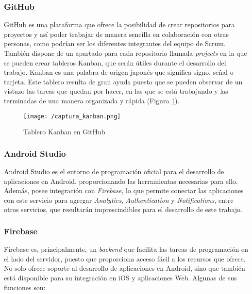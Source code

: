 \subsubsection*{GitHub}
GitHub es una plataforma que ofrece la posibilidad de crear repositorios para proyectos y así poder trabajar de manera sencilla en colaboración con otras personas, como podrían ser los diferentes integrantes del equipo de Scrum. También dispone de un apartado para cada repositorio llamada \textit{projects} en la que se pueden crear tableros Kanban, que serán útiles durante el desarrollo del trabajo. Kanban \cite{Gomez2017} es una palabra de origen japonés que significa signo, señal o tarjeta. Este tablero resulta de gran ayuda puesto que se pueden observar de un vistazo las tareas que quedan por hacer, en las que se está trabajando y las terminadas de una manera organizada y rápida (Figura \ref{fig:kanban}).

\begin{figure}[!h]
	\begin{center}
		\texttt{[image: /captura\_kanban.png]}
		\caption{Tablero Kanban en GitHub}
		\label{fig:kanban}
	\end{center}
\end{figure}

\clearpage

\subsubsection*{Android Studio}
Android Studio \cite{AndroidStudio} es el entorno de programación oficial para el desarrollo de aplicaciones en Android, proporcionando las herramientas necesarias para ello. Además, posee integración con \textit{Firebase}, lo que permite conectar las aplicaciones con este servicio para agregar \textit{Analytics}, \textit{Authentication} y \textit{Notifications}, entre otros servicios, que resultarán imprescindibles para el desarrollo de este trabajo.

\subsubsection*{Firebase}
Firebase \cite{GooFirebase} es, principalmente, un \textit{backend} que facilita las tareas de programación en el lado del servidor, puesto que proporciona acceso fácil a los recursos que ofrece. No solo ofrece soporte al desarrollo de aplicaciones en Android, sino que también está disponible para su integración en iOS y aplicaciones Web. Algunas de sus funciones son:

